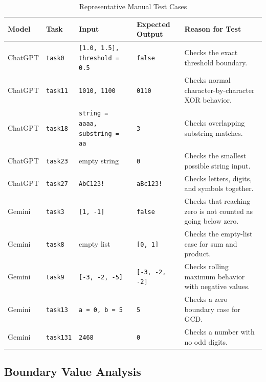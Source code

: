 \documentclass[journal]{IEEEtran}
\begin{document}
\begin{table}[!t]
\renewcommand{\arraystretch}{1.2}
\caption{Representative Manual Test Cases}
\label{tab:manual-tests}
\centering
\footnotesize
\begin{tabular}{p{}p{}p{}p{}p{}}
\toprule
\textbf{Model} & \textbf{Task} & \textbf{Input} & \textbf{Expected Output} & \textbf{Reason for Test} \\
\midrule

ChatGPT & \texttt{task0} & \texttt{[1.0, 1.5], threshold = 0.5} & \texttt{false} & Checks the exact threshold boundary. \\
ChatGPT & \texttt{task11} & \texttt{1010, 1100} & \texttt{0110} & Checks normal character-by-character XOR behavior. \\
ChatGPT & \texttt{task18} & \texttt{string = aaaa, substring = aa} & \texttt{3} & Checks overlapping substring matches. \\
ChatGPT & \texttt{task23} & empty string & \texttt{0} & Checks the smallest possible string input. \\
ChatGPT & \texttt{task27} & \texttt{AbC123!} & \texttt{aBc123!} & Checks letters, digits, and symbols together. \\

\midrule

Gemini & \texttt{task3} & \texttt{[1, -1]} & \texttt{false} & Checks that reaching zero is not counted as going below zero. \\
Gemini & \texttt{task8} & empty list & \texttt{[0, 1]} & Checks the empty-list case for sum and product. \\
Gemini & \texttt{task9} & \texttt{[-3, -2, -5]} & \texttt{[-3, -2, -2]} & Checks rolling maximum behavior with negative values. \\
Gemini & \texttt{task13} & \texttt{a = 0, b = 5} & \texttt{5} & Checks a zero boundary case for GCD. \\
Gemini & \texttt{task131} & \texttt{2468} & \texttt{0} & Checks a number with no odd digits. \\

\bottomrule
\end{tabular}
\end{table}

\subsection{Boundary Value Analysis}
\end{document}
